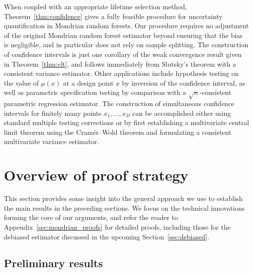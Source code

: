 When coupled with an appropriate lifetime selection method,
Theorem~\ref{thm:confidence} gives a fully feasible procedure
for uncertainty quantification in Mondrian random forests.
Our procedure requires no adjustment of the original Mondrian random
forest estimator beyond ensuring that the bias is negligible,
and in particular does not rely on sample splitting.
The construction of confidence intervals is just one corollary
of the weak convergence result given in Theorem~\ref{thm:clt},
and follows immediately from Slutsky's theorem
with a consistent variance estimator.
Other applications include hypothesis testing on the value
of $\mu(x)$ at a design point $x$ by inversion of the confidence interval,
as well as parametric specification testing by comparison with
a $\sqrt{n}$-consistent parametric regression estimator.
The construction of simultaneous confidence
intervals for finitely many points $x_1, \ldots, x_D$
can be accomplished either using standard multiple testing corrections
or by first establishing a multivariate
central limit theorem using the Cram{\'e}r--Wold theorem
and formulating a consistent multivariate variance estimator.

\section{Overview of proof strategy}%
\label{sec:overview_proofs}

This section provides some insight into
the general approach we use to establish the main results
in the preceding sections. We focus on the technical innovations
forming the core of our arguments, and refer the reader to
Appendix~\ref{sec:mondrian_proofs} for detailed proofs,
including those for the debiased estimator discussed in the upcoming
Section~\ref{sec:debiased}.

\subsection*{Preliminary results}

